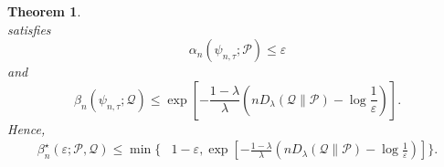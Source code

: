 \documentclass[journal,12pt,draftclsnofoot,onecolumn]{IEEEtran}
\newtheorem{theorem}{Theorem}
\begin{document}
\begin{theorem}
\begin{equation*}
{}
\end{equation*}
satisfies
\begin{equation*}
\alpha_n(\psi_{n,\tau};\mathcal P)\leq
\varepsilon
\end{equation*}
and
\begin{equation*}
\beta_n(\psi_{n,\tau};\mathcal Q)\leq \exp\left[-\frac{1-\lambda}{\lambda}\left(nD_\lambda(\mathcal Q\|\mathcal P)-\log\frac{1}{\varepsilon}
\right)\right].
\end{equation*}
Hence,
\begin{equation}
\begin{aligned}
\beta_n^\star(\varepsilon;\mathcal P,\mathcal Q) \leq \min\Bigg\{& 1-\varepsilon, \exp\left[ -\frac{1-\lambda}{\lambda} \left( nD_\lambda(\mathcal Q\|\mathcal P)-\log\frac{1}{\varepsilon}\right) \right]\Bigg\}.
\end{aligned}
\label{eq:projected-finite-blocklength-achievability}
\end{equation}

\end{theorem}


\appendices
\end{document}
